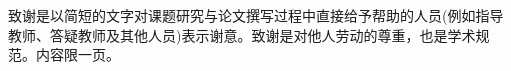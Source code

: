 \documentclass[type = doctor,class = academic]{whu-thesis}
\begin{document}
\tableofcontents %


\mainmatter












\printbibliography

\begin{acknowledgements}
  致谢是以简短的文字对课题研究与论文撰写过程中直接给予帮助的人员(例如指导教师、答疑教师及其他人员)表示谢意。致谢是对他人劳动的尊重，也是学术规范。内容限一页。
\end{acknowledgements}


% 
\end{document}
